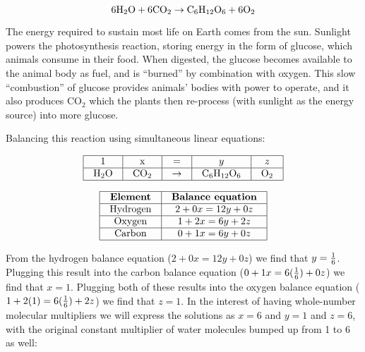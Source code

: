 





$$\hbox{6H}_2\hbox{O} + \hbox{6CO}_2 \to \hbox{C}_6\hbox{H}_{12}\hbox{O}_6 + \hbox{6O}_2$$

\vskip 10pt

The energy required to sustain most life on Earth comes from the sun.  Sunlight powers the photosynthesis reaction, storing energy in the form of glucose, which animals consume in their food.  When digested, the glucose becomes available to the animal body as fuel, and is ``burned'' by combination with oxygen.  This slow ``combustion'' of glucose provides animals' bodies with power to operate, and it also produces CO$_{2}$ which the plants then re-process (with sunlight as the energy source) into more glucose.







Balancing this reaction using simultaneous linear equations:


$$\vbox{\offinterlineskip
\halign{\strut
\vrule \quad\hfil # \ \hfil & 
\vrule \quad\hfil # \ \hfil & 
\vrule \quad\hfil # \ \hfil & 
\vrule \quad\hfil # \ \hfil & 
\vrule \quad\hfil # \ \hfil \vrule \cr
\noalign{\hrule}
%
1 & x & = & $y$ & $z$ \cr
%
\noalign{\hrule}
%
H$_{2}$O & CO$_{2}$ & $\to$ & C$_{6}$H$_{12}$O$_{6}$ & O$_{2}$ \cr
%
\noalign{\hrule}
} %
}$$ %


$$\vbox{\offinterlineskip
\halign{\strut
\vrule \quad\hfil # \ \hfil & 
\vrule \quad\hfil # \ \hfil \vrule \cr
\noalign{\hrule}
%
{\bf Element} & {\bf Balance equation} \cr
%
\noalign{\hrule}
%
Hydrogen & $2 + 0x = 12y + 0z$ \cr
%
\noalign{\hrule}
%
Oxygen & $1 + 2x = 6y + 2z$ \cr
%
\noalign{\hrule}
%
Carbon & $0 + 1x = 6y + 0z$ \cr
%
\noalign{\hrule}
} %
}$$ %

From the hydrogen balance equation ($2 + 0x = 12y + 0z$) we find that $y = {1 \over 6}$.  Plugging this result into the carbon balance equation ($0 + 1x = 6({1 \over 6}) + 0z$) we find that $x = 1$.  Plugging both of these results into the oxygen balance equation ($1 + 2(1) = 6({1 \over 6}) + 2z$) we find that $z = 1$.  In the interest of having whole-number molecular multipliers we will express the solutions as $x = 6$ and $y = 1$ and $z = 6$, with the original constant multiplier of water molecules bumped up from 1 to 6 as well:

